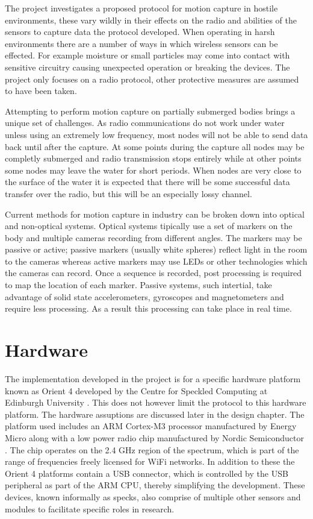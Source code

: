 \documentclass[parskip]{cs4rep}
\begin{document}
The project investigates a proposed protocol for motion capture in hostile environments, these vary wildly in their effects on the radio and abilities of the sensors to capture data the protocol developed. When operating in harsh environments there are a number of ways in which wireless sensors can be effected. For example moisture or small particles may come into contact with sensitive circuitry causing unexpected operation or breaking the devices. The project only focuses on a radio protocol, other protective measures are assumed to have been taken.

Attempting to perform motion capture on partially submerged bodies brings a unique set of challenges. As radio communications do not work under water unless using an extremely low frequency, most nodes will not be able to send data back until after the capture. At some points during the capture all nodes may be completly submerged and radio transmission stops entirely while at other points some nodes may leave the water for short periods. When nodes are very close to the surface of the water it is expected that there will be some successful data transfer over the radio, but this will be an especially lossy channel. 

Current methods for motion capture in industry can be broken down into optical and non-optical systems. Optical systems tipically use a set of markers on the body and multiple cameras recording from different angles. The markers may be passive or active; passive markers (usually white spheres) reflect light in the room to the cameras whereas active markers may use LEDs or other technologies which the cameras can record. Once a sequence is recorded, post processing is required to map the location of each marker. Passive systems, such intertial, take advantage of solid state accelerometers, gyroscopes and magnetometers and require less processing. As a result this processing can take place in real time. 

\section{Hardware}

The implementation developed in the project is for a specific hardware platform known as Orient 4 developed by the Centre for Speckled Computing at Edinburgh University \cite{W5}. This does not however limit the protocol to this hardware platform. The hardware assuptions are discussed later in the design chapter. The platform used includes an ARM Cortex-M3 processor manufactured by Energy Micro \cite{W1} along with a low power radio chip manufactured by Nordic Semiconductor \cite{W5}. The chip operates on the 2.4 GHz region of the spectrum, which is part of the range of frequencies freely licensed for WiFi networks. In addition to these the Orient 4 platforms contain a USB connector, which is controlled by the USB peripheral as part of the ARM CPU, thereby simplifying the development. These devices, known informally as specks, also comprise of multiple other sensors and modules to facilitate specific roles in research.
\end{document}
